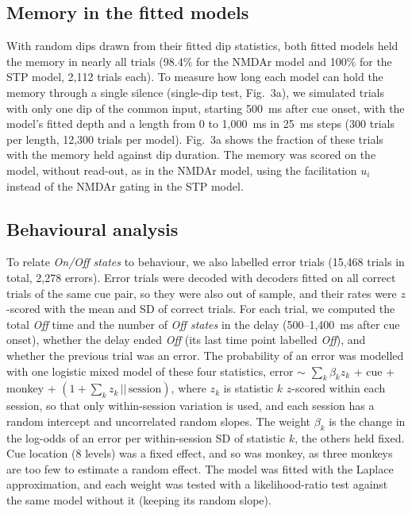\documentclass[11pt]{article}
\begin{document}
\subsection{Memory in the fitted models}

With random dips drawn from their fitted dip statistics, both fitted models held the memory in nearly all trials (98.4\% for the NMDAr model and 100\% for the STP model, 2,112 trials each). To measure how long each model can hold the memory through a single silence (single-dip test, Fig.~3a), we simulated trials with only one dip of the common input, starting 500~ms after cue onset, with the model's fitted depth and a length from 0 to 1,000~ms in 25~ms steps (300 trials per length, 12,300 trials per model). Fig.~3a shows the fraction of these trials with the memory held against dip duration. The memory was scored on the model, without read-out, as in the NMDAr model, using the facilitation $u_i$ instead of the NMDAr gating in the STP model.

\subsection{Behavioural analysis}

To relate \emph{On/Off states} to behaviour, we also labelled error trials (15,468 trials in total, 2,278 errors). Error trials were decoded with decoders fitted on all correct trials of the same cue pair, so they were also out of sample, and their rates were $z$-scored with the mean and SD of correct trials. For each trial, we computed the total \emph{Off} time and the number of \emph{Off states} in the delay (500--1,400~ms after cue onset), whether the delay ended \emph{Off} (its last time point labelled \emph{Off}), and whether the previous trial was an error. The probability of an error was modelled with one logistic mixed model of these four statistics, error ${\sim}$ $\sum_k \beta_k z_k$ + cue + monkey + $(1 + \sum_k z_k \,||\, \mathrm{session})$, where $z_k$ is statistic $k$ $z$-scored within each session, so that only within-session variation is used, and each session has a random intercept and uncorrelated random slopes. The weight $\beta_k$ is the change in the log-odds of an error per within-session SD of statistic $k$, the others held fixed. Cue location (8 levels) was a fixed effect, and so was monkey, as three monkeys are too few to estimate a random effect. The model was fitted with the Laplace approximation, and each weight was tested with a likelihood-ratio test against the same model without it (keeping its random slope).
\end{document}
